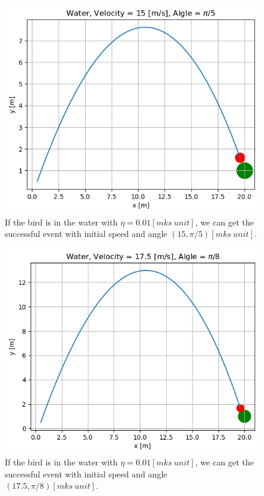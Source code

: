 \documentclass[12pt]{article}
\begin{document}
    \begin{figure}[H]
      \centering 
      \includegraphics[width = 12cm]{water1.png}
      \caption{If the bird is in the water with $\eta = 0.01[mks\ unit]$, we can get the successful event with initial speed and angle $(15, \pi / 5) [mks\ unit]$.\label{water1}}
    \end{figure}

    \begin{figure}[H]
      \centering 
      \includegraphics[width = 12cm]{water2.png}
      \caption{If the bird is in the water with $\eta = 0.01[mks\ unit]$, we can get the successful event with initial speed and angle $(17.5, \pi / 8) [mks\ unit]$.\label{water2}}
    \end{figure}
\end{document}
